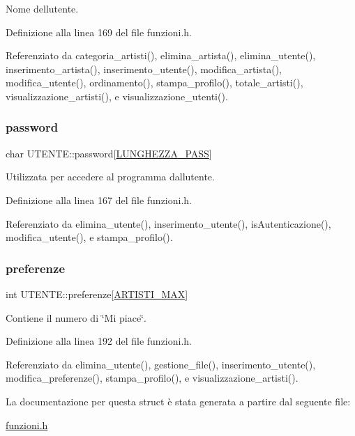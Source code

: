 Nome dell\textquotesingle{}utente. 

Definizione alla linea 169 del file funzioni.\+h.



Referenziato da categoria\+\_\+artisti(), elimina\+\_\+artista(), elimina\+\_\+utente(), inserimento\+\_\+artista(), inserimento\+\_\+utente(), modifica\+\_\+artista(), modifica\+\_\+utente(), ordinamento(), stampa\+\_\+profilo(), totale\+\_\+artisti(), visualizzazione\+\_\+artisti(), e visualizzazione\+\_\+utenti().

\mbox{\label{struct_u_t_e_n_t_e_a04d8337f5e0fe9cd44d36cbe7dac7415}} 
\subsubsection{\texorpdfstring{password}{password}}
{\footnotesize\ttfamily char U\+T\+E\+N\+T\+E\+::password\mbox{[}\hyperlink{funzioni_8h_a21981b6e8c0f57093d564c3df476f9ee}{L\+U\+N\+G\+H\+E\+Z\+Z\+A\+\_\+\+P\+A\+SS}\mbox{]}}

Utilizzata per accedere al programma dall\textquotesingle{}utente. 

Definizione alla linea 167 del file funzioni.\+h.



Referenziato da elimina\+\_\+utente(), inserimento\+\_\+utente(), is\+Autenticazione(), modifica\+\_\+utente(), e stampa\+\_\+profilo().

\mbox{\label{struct_u_t_e_n_t_e_a1b4dec4c7ed79c12a76501b634b71176}} 
\subsubsection{\texorpdfstring{preferenze}{preferenze}}
{\footnotesize\ttfamily int U\+T\+E\+N\+T\+E\+::preferenze\mbox{[}\hyperlink{funzioni_8h_af17e5297d3cc4c2db33d467698a1b9c2}{A\+R\+T\+I\+S\+T\+I\+\_\+\+M\+AX}\mbox{]}}

Contiene il numero di \char`\"{}\+Mi piace\char`\"{}. 

Definizione alla linea 192 del file funzioni.\+h.



Referenziato da elimina\+\_\+utente(), gestione\+\_\+file(), inserimento\+\_\+utente(), modifica\+\_\+preferenze(), stampa\+\_\+profilo(), e visualizzazione\+\_\+artisti().



La documentazione per questa struct è stata generata a partire dal seguente file\+:\begin{DoxyCompactItemize}
\item 
\hyperlink{funzioni_8h}{funzioni.\+h}\end{DoxyCompactItemize}

